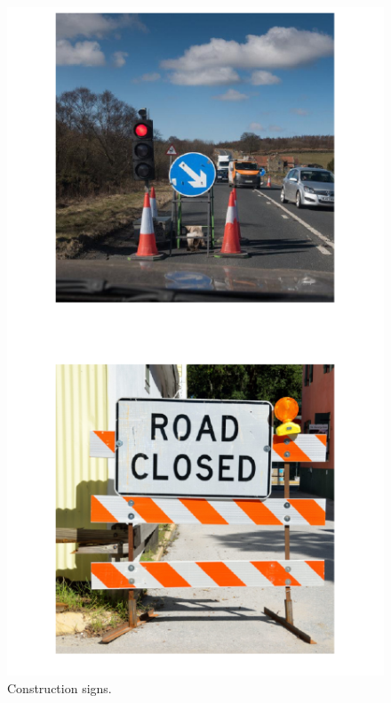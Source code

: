 \begin{figure}[!htb]
\begin{center}
\includegraphics[scale=0.280]{img/intro_self_driving/construction_signs.jpeg}
\end{center}
\caption{Construction signs.}
\label{construction_signs}
\end{figure}

